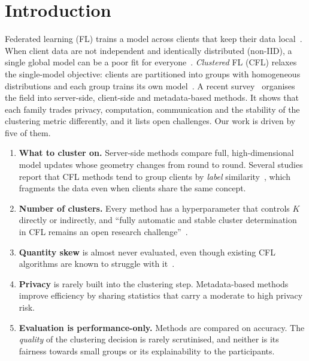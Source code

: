\documentclass[pdflatex,sn-apa]{sn-jnl}
\theoremstyle{thmstyleone}
\theoremstyle{thmstylethree}
\begin{document}
\section{Introduction}
Federated learning (FL) trains a model across clients that keep their data local~\citep{mcmahan2017fedavg,kairouz2021advances}. When client data are not independent and identically distributed (non-IID), a single global model can be a poor fit for everyone~\citep{zhao2018noniid}. \emph{Clustered} FL (CFL) relaxes the single-model objective: clients are partitioned into groups with homogeneous distributions and each group trains its own model~\citep{sattler2021cfl,ghosh2020ifca,briggs2020flhc}. A recent survey~\citep{benali2026survey} organises the field into server-side, client-side and metadata-based methods. It shows that each family trades privacy, computation, communication and the stability of the clustering metric differently, and it lists open challenges. Our work is driven by five of them.
\begin{enumerate}[leftmargin=*,itemsep=1pt]
\item \textbf{What to cluster on.} Server-side methods compare full, high-dimensional model updates whose geometry changes from round to round. Several studies report that CFL methods tend to group clients by \emph{label} similarity~\citep{guo2024fedrc}, which fragments the data even when clients share the same concept.
\item \textbf{Number of clusters.} Every method has a hyperparameter that controls $K$ directly or indirectly, and ``fully automatic and stable cluster determination in CFL remains an open research challenge''~\citep{benali2026survey}.
\item \textbf{Quantity skew} is almost never evaluated, even though existing CFL algorithms are known to struggle with it~\citep{benali2025cornflqs}.
\item \textbf{Privacy} is rarely built into the clustering step. Metadata-based methods improve efficiency by sharing statistics that carry a moderate to high privacy risk.
\item \textbf{Evaluation is performance-only.} Methods are compared on accuracy. The \emph{quality} of the clustering decision is rarely scrutinised, and neither is its fairness towards small groups or its explainability to the participants.
\end{enumerate}
\end{document}

